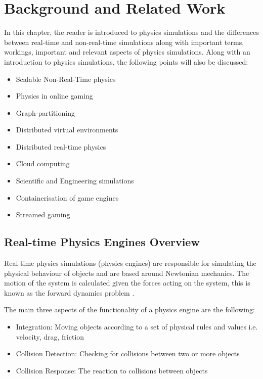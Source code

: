 \chapter{Background and Related Work}
In this chapter, the reader is introduced to physics simulations and the differences between real-time and non-real-time simulations along with important terms, workings, important and relevant aspects of physics simulations. Along with an introduction to physics simulations, the following points will also be discussed:
\begin{itemize}
	\item Scalable Non-Real-Time physics
	\item Physics in online gaming
	\item Graph-partitioning
	\item Distributed virtual environments
	\item Distributed real-time physics
	\item Cloud computing
	\item Scientific and Engineering simulations
	\item Containerisation of game engines
	\item Streamed gaming
\end{itemize}

\section{Real-time Physics Engines Overview}

Real-time physics simulations (physics engines) are responsible for simulating the physical behaviour of objects and are based around Newtonian mechanics. The motion of the system is calculated given the forces acting on the system, this is known as the forward dynamics problem \cite{Boeing2007}.

The main three aspects of the functionality of a physics engine are the following:
\begin{itemize}
	\item Integration: Moving objects according to a set of physical rules and values i.e. velocity, drag, friction
	\item Collision Detection: Checking for collisions between two or more objects
	\item Collision Response: The reaction to collisions between objects
\end{itemize}

